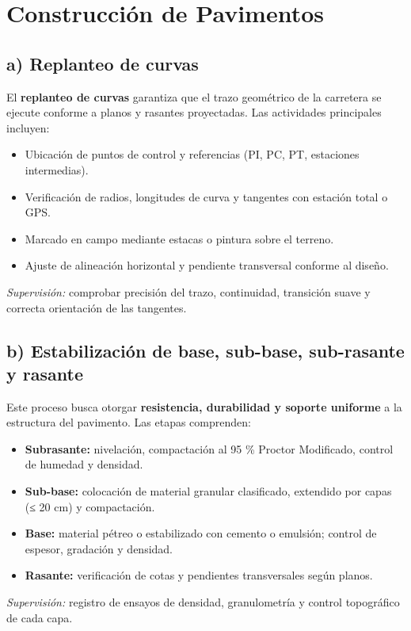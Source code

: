\documentclass[12pt]{article}
\begin{document}
	
	
	
	
	
	
	\section{Construcción de Pavimentos }
	
	\subsection*{a) Replanteo de curvas}
	El \textbf{replanteo de curvas} garantiza que el trazo geométrico de la carretera se ejecute conforme a planos y rasantes proyectadas.  
	Las actividades principales incluyen:
	\begin{itemize}[leftmargin=*, itemsep=2pt]
		\item Ubicación de puntos de control y referencias (PI, PC, PT, estaciones intermedias).
		\item Verificación de radios, longitudes de curva y tangentes con estación total o GPS.
		\item Marcado en campo mediante estacas o pintura sobre el terreno.
		\item Ajuste de alineación horizontal y pendiente transversal conforme al diseño.
	\end{itemize}
	\textit{Supervisión:} comprobar precisión del trazo, continuidad, transición suave y correcta orientación de las tangentes.
	
	\subsection*{b) Estabilización de base, sub-base, sub-rasante y rasante}
	Este proceso busca otorgar \textbf{resistencia, durabilidad y soporte uniforme} a la estructura del pavimento.  
	Las etapas comprenden:
	\begin{itemize}[leftmargin=*, itemsep=2pt]
		\item \textbf{Subrasante:} nivelación, compactación al 95 \% Proctor Modificado, control de humedad y densidad.
		\item \textbf{Sub-base:} colocación de material granular clasificado, extendido por capas (≤ 20 cm) y compactación.
		\item \textbf{Base:} material pétreo o estabilizado con cemento o emulsión; control de espesor, gradación y densidad.
		\item \textbf{Rasante:} verificación de cotas y pendientes transversales según planos.
	\end{itemize}
	\textit{Supervisión:} registro de ensayos de densidad, granulometría y control topográfico de cada capa.
	
\end{document}
